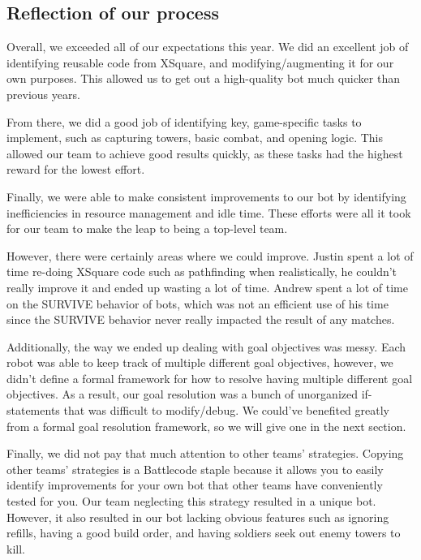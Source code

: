 \subsection{Reflection of our process}

Overall, we exceeded all of our expectations this year. We did an excellent job of identifying reusable code from XSquare, and modifying/augmenting it for our own purposes. This allowed us to get out a high-quality bot much quicker than previous years.

\medskip

From there, we did a good job of identifying key, game-specific tasks to implement, such as capturing towers, basic combat, and opening logic. This allowed our team to achieve good results quickly, as these tasks had the highest reward for the lowest effort.

\medskip

Finally, we were able to make consistent improvements to our bot by identifying inefficiencies in resource management and idle time. These efforts were all it took for our team to make the leap to being a top-level team.

\medskip

However, there were certainly areas where we could improve. Justin spent a lot of time re-doing XSquare code such as pathfinding when realistically, he couldn't really improve it and ended up wasting a lot of time. Andrew spent a lot of time on the SURVIVE behavior of bots, which was not an efficient use of his time since the SURVIVE behavior never really impacted the result of any matches.

\medskip

Additionally, the way we ended up dealing with goal objectives was messy. Each robot was able to keep track of multiple different goal objectives, however, we didn't define a formal framework for how to resolve having multiple different goal objectives. As a result, our goal resolution was a bunch of unorganized if-statements that was difficult to modify/debug. We could've benefited greatly from a formal goal resolution framework, so we will give one in the next section.

\medskip

Finally, we did not pay that much attention to other teams' strategies. Copying other teams' strategies is a Battlecode staple because it allows you to easily identify improvements for your own bot that other teams have conveniently tested for you. Our team neglecting this strategy resulted in a unique bot. However, it also resulted in our bot lacking obvious features such as ignoring refills, having a good build order, and having soldiers seek out enemy towers to kill.

